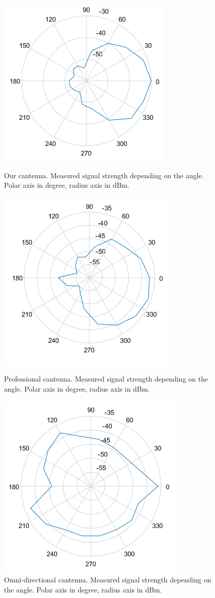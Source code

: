 		\begin{figure}\begin{center}
				\includegraphics[width=.45\textwidth]{plots/cantenna_power_cut.png}
				\caption{Our cantenna. Measured signal strength depending on the angle. Polar axis in degree, radius axis in dBm.}
				\label{img:ang:pow:can}
				
				\includegraphics[width=.45\textwidth]{plots/prof_power_cut.png}
				\caption{Professional cantenna. Measured signal strength depending on the angle. Polar axis in degree, radius axis in dBm.}
				\label{img:ang:pow:prof}
				
				\includegraphics[width=.45\textwidth]{plots/poer_omni_cut.png}
				\caption{Omni-directional cantenna. Measured signal strength depending on the angle. Polar axis in degree, radius axis in dBm.}
				\label{img:ang:pow:omni}
			\end{center}\end{figure}
			
